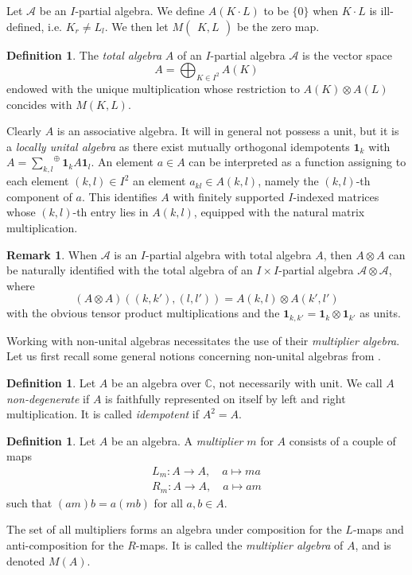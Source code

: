 \documentclass[10pt]{article}
\newcommand{\C}{\mathbb{C}}
\newcommand{\osum}[1]{\underset{#1}{\sum}^{\oplus}}
\newcommand{\Grs}[3]{#1{\begin{pmatrix} #2,  #3\end{pmatrix}}}
\newcommand{\Unit}{\mathbf{1}}
\newcommand{\wmult}{\cdot}
\theoremstyle{definition}
\newtheorem{Def}[Theorem]{Definition}
\newtheorem{Rem}[Theorem]{Remark}
\numberwithin{equation}{section}
\begin{document}
Let $\mathscr{A}$ be an $I$-partial algebra. We define $A(K\wmult L)$ to be $\{0\}$ when $K\wmult L$ is ill-defined, i.e. $K_r\neq L_l$. We then let $\Grs{M}{K}{L}$ be the zero map.

\begin{Def} The \emph{total algebra} $A$ of an $I$-partial algebra $\mathscr{A}$ is the vector space \[A = \bigoplus_{K\in I^2} A(K)\] endowed with the unique multiplication whose restriction to $A(K)\otimes A(L)$ concides with $M(K,L)$. 
\end{Def} 

Clearly $A$ is an associative algebra. It will in general not possess a unit, but it is a \emph{locally unital algebra} as there exist mutually orthogonal idempotents $\mathbf{1}_k$ with $A = \osum{k,l} \mathbf{1}_kA\mathbf{1}_l$. An element $a\in A$ can be interpreted as a function assigning to each element $(k,l)\in I^2$ an element $a_{kl}\in A(k,l)$, namely the $(k,l)$-th component of $a$. This identifies $A$ with finitely supported $I$-indexed matrices whose $(k,l)$-th entry lies in $A(k,l)$, equipped with the natural matrix multiplication. 

\begin{Rem}\label{RemGrad} When $\mathscr{A}$ is an $I$-partial algebra with total algebra $A$, then $A\otimes A$ can be naturally identified with the total algebra of an $I\times I$-partial algebra $\mathscr{A}\otimes \mathscr{A}$, where \[(A\otimes A)((k,k'),(l,l')) = A(k,l)\otimes A(k',l')\] with the obvious tensor product multiplications and the $\Unit_{k,k'} = \Unit_k\otimes \Unit_{k'}$ as units. 
\end{Rem}

Working with non-unital algebras necessitates the use of their \emph{multiplier algebra}. Let us first recall some general notions concerning non-unital algebras from \cite{Dau1,VDae1}.

\begin{Def} Let $A$ be an algebra over $\C$, not necessarily with unit. We call $A$ \emph{non-degenerate} if $A$ is faithfully represented on itself by left and right multiplication. It is called \emph{idempotent} if $A^2 = A$. 
\end{Def}

\begin{Def} Let $A$ be an algebra. A \emph{multiplier} $m$ for $A$ consists of a couple of maps \begin{eqnarray*} L_m:A\rightarrow A,\quad a\mapsto ma\\ R_m:A\rightarrow A,\quad a\mapsto am\end{eqnarray*} such that $(am)b = a(mb)$ for all $a,b\in A$. 

The set of all multipliers forms an algebra under composition for the $L$-maps and anti-composition for the $R$-maps. It is called the \emph{multiplier algebra} of $A$, and is denoted $M(A)$.
\end{Def}
\end{document}
